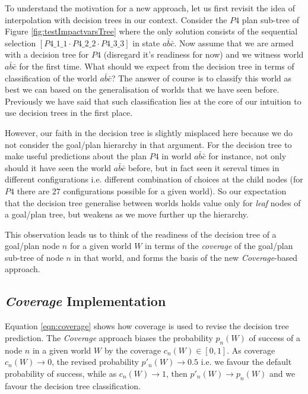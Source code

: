 \documentclass[a4paper]{article}
\newcommand{\cov}{\emph{Coverage}\xspace}
\newcommand{\dt}{{decision tree}\xspace}
\begin{document}
To understand the motivation for a new approach, let us first revisit the idea of interpolation with {\dt}s in our context. Consider the $P4$ plan sub-tree of Figure \ref{fig:testImpactvarsTree} where the only solution consists of the sequential selection $[P4\_1\_1 \cdot P4\_2\_2 \cdot P4\_3\_3]$ in state $a\bar{b}\bar{c}$. Now assume that we are armed with a \dt for $P4$ (disregard it's readiness for now) and we witness world $a\bar{b}\bar{c}$ for the first time. What should we expect from the {\dt} in terms of classification of the world $a\bar{b}\bar{c}$? The answer of course is to classify this world as best we can based on the generalisation of worlds that we have seen before. Previously we have said that such classification lies at the core of our intuition to use {\dt}s in the first place. 

However, our faith in the \dt is slightly misplaced here because we do not consider the goal/plan hierarchy in that argument. For the \dt to make useful predictions about the plan $P4$ in world $a\bar{b}\bar{c}$ for instance, not only should it have seen the world $a\bar{b}\bar{c}$ before, but in fact seen it sereval times in different configurations i.e. different combination of choices at the child nodes (for $P4$ there are $27$ configurations possible for a given world). So our expectation that the \dt generalise between worlds holds value only for \textit{leaf} nodes of a goal/plan tree, but weakens as we move further up the hierarchy. 

This observation leads us to think of the readiness of the \dt of a goal/plan node $n$ for a given world $W$ in terms of the \textit{coverage} of the goal/plan sub-tree of node $n$ in that world, and forms the basis of the new {\cov}-based approach.


\subsection{\cov Implementation}
\label{subsec:coverage1-implementation}

Equation \ref{eqn:coverage} shows how coverage is used to revise the \dt prediction. The \cov approach biases the probability $p_n(W)$ of success of a node $n$ in a given world $W$ by the coverage $c_n(W) \in [0,1]$. As coverage $ c_n(W) \rightarrow 0$, the revised probability $p'_n(W) \rightarrow 0.5$ i.e. we favour the default probability of success, while as  $ c_n(W) \rightarrow 1$, then $p'_n(W) \rightarrow p_n(W)$ and we favour the \dt classification.
\end{document}
